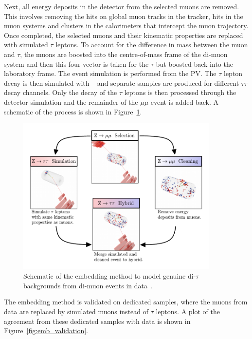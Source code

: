 Next, all energy deposits in the detector from the selected muons are removed.
This involves removing the hits on global muon tracks in the tracker, hits in the muon systems and clusters in the calorimeters that intercept the muon trajectory.
Once completed, the selected muons and their kinematic properties are replaced with simulated $\tau$ leptons.
To account for the difference in mass between the muon and $\tau$, the muons are boosted into the centre-of-mass frame of the di-muon system and then this four-vector is taken for the $\tau$ but boosted back into the laboratory frame.
The event simulation is performed from the \ac{PV}.
The $\tau$ lepton decay is then simulated with \PYTHIA~\cite{Sirunyan:2019dfx,Sjostrand:2014zea} and separate samples are produced for different $\tau\tau$ decay channels.
Only the decay of the $\tau$ leptons is then processed through the detector simulation and the remainder of the $\mu\mu$ event is added back.
A schematic of the process is shown in Figure~\ref{fig:embedding}. \\

\begin{figure}[t]
\centering
    \includegraphics[width=0.9\textwidth]{Figures/Embedding_Diagram.pdf}
\caption[Diagram of the embedding method.]{Schematic of the embedding method to model genuine di-$\tau$ backgrounds from di-muon events in data~\cite{CMS_embedding}.}
\label{fig:embedding}
\end{figure}

The embedding method is validated on dedicated samples, where the muons from data are replaced by simulated muons instead of $\tau$ leptons.
A plot of the agreement from these dedicated samples with data is shown in Figure~\ref{fig:emb_validation}.


